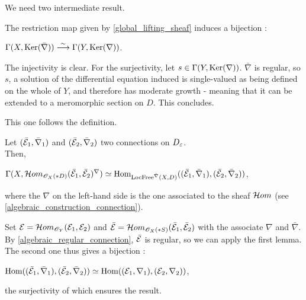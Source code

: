 We need two intermediate result.\\

\begin{mylemme}
The restriction map given by \ref{global_lifting_sheaf} induces a bijection :
\begin{center}
$\Gamma(X, \text{Ker}(\bar{\nabla})) \overset{\sim}{\longrightarrow} \Gamma(Y,\text{Ker}(\nabla))$.
\end{center}
\end{mylemme}

\begin{mydemo}
The injectivity is clear. For the surjectivity, let $s \in \Gamma(Y,\text{Ker}(\nabla))$. $\bar{\nabla}$ is regular, so $s$, a solution of the differential equation induced is single-valued as being defined on the whole of $Y$, and therefore has moderate growth - meaning that it can be extended to a meromorphic section on $D$. This concludes.
\end{mydemo}


This one follows the definition.

\begin{mylemme}
Let $(\bar{\mathcal{E}}_1,\bar{\nabla}_1)$ and $(\bar{\mathcal{E}}_2,\bar{\nabla}_2)$ two connections on $D_\varepsilon$.\\
Then,
\begin{center}
$\Gamma(X,\mathcal{H}om_{\mathscr{O}_{X}(*D)}(\bar{\mathcal{E}}_1,\bar{\mathcal{E}}_2)^\nabla) \simeq \text{Hom}_{\text{LocFree}^{\bar{\nabla}}(X,D)}((\bar{\mathcal{E}}_1,\bar{\nabla}_1),(\bar{\mathcal{E}}_2,\bar{\nabla}_2))$,
\end{center}
where the $\nabla$ on the left-hand side is the one associated to the sheaf $\mathcal{H}om$ (see \ref{algebraic_construction_connection}).
\end{mylemme}


\begin{mydemo}[\ref{lifting_sheaf}]
Set $\mathcal{E} = \mathcal{H}om_{\mathscr{O}_Y}(\mathcal{E}_1,\mathcal{E}_2)$ and $\bar{\mathcal{E}} = \mathcal{H}om_{\mathscr{O}_{X}(*S)}(\bar{\mathcal{E}}_1,\bar{\mathcal{E}}_2)$ with the associate $\nabla$ and $\bar{\nabla}$. By \ref{algebraic_regular_connection}, $\bar{\mathcal{E}}$ is regular, so we can apply the first lemma. The second one thus gives a bijection :
\begin{center}
$\text{Hom}((\bar{\mathcal{E}}_1,\bar{\nabla}_1),(\bar{\mathcal{E}}_2,\bar{\nabla}_2)) \simeq \text{Hom}((\mathcal{E}_1,\nabla_1),(\mathcal{E}_2,\nabla_2))$,
\end{center}
the surjectivity of which ensures the result.
\end{mydemo}




